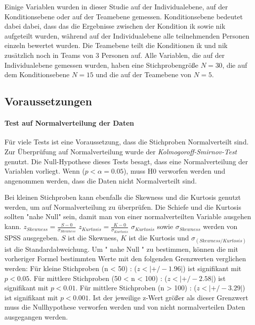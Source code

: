 \documentclass[a4paper,11pt]{article}%
\renewcommand{\\}{\vspace*{0.5\baselineskip} \newline}
\begin{document}
Einige Variablen wurden in dieser Studie auf der Individualebene, auf der Konditionsebene oder auf der Teamebene gemessen.
Konditionsebene bedeutet dabei dabei, dass das die Ergebnisse zwischen der Kondition \ac{ik} sowie \ac{nik} aufgeteilt wurden, während auf der Individualebene alle teilnehmenden Personen einzeln bewertet wurden. Die Teamebene teilt die Konditionen \ac{ik} und \ac{nik} zusätzlich noch in Teams von 3 Personen auf.  Alle Variablen, die auf der Individualebene gemessen wurden, haben eine Stichprobengröße $N = 30$, die auf dem Konditionsebene $ N = 15$ und die auf der Teamebene von $N = 5$.

	\subsection{Voraussetzungen}
	
\paragraph{Test auf Normalverteilung der Daten}
Für viele Tests ist eine Voraussetzung, dass die Stichproben Normalverteilt sind. Zur Überprüfung auf Normalverteilung wurde der \textit{Kolmogoroff-Smirnov-Test} genutzt. Die Null-Hypothese dieses Tests besagt, dass eine Normalverteilung der Variablen vorliegt. Wenn ($p < \alpha = 0.05$), muss H0 verworfen werden und angenommen werden, dass die Daten nicht Normalverteilt sind.

Bei kleinen Stichproben kann ebenfalls die Skewness und die Kurtosis genutzt werden, um auf Normalverteilung zu überprüfen. 
Die Schiefe und die Kurtosis sollten "nahe Null" sein, damit man von einer normalverteilten Variable ausgehen kann. \\$ z_{Skewness} = \frac{S-0}{\sigma_{Skewness}} $ \\ $ z_{Kurtosis} = \frac{K-0}{\sigma_{Kurtosis}} $ \\
$\sigma_{Kurtosis}$ sowie $\sigma_{Skewness}$ werden von SPSS ausgegeben. $S$ ist die Skewness, $K$ ist die Kurtosis und ${\sigma_{(Skewness/Kurtosis)}}$ ist die Standardabweichung.
Um " nahe Null " zu bestimmen, können die mit vorheriger Formel bestimmten Werte mit den folgenden Grenzwerten verglichen werden:
Für kleine Stichproben (n < 50) : ($z < |+/-1.96|$) ist signifikant mit $p<0.05$. \newline
Für mittlere Stichproben (50 < n < 100) : ($z < |+/-2.58|$) ist signifikant mit $p<0.01$. \newline
Für mittlere Stichproben (n > 100) : ($z < |+/-3.29|$) ist signifikant mit $p<0.001$. \newline
Ist der jeweilige z-Wert größer als dieser Grenzwert muss die Nullhypothese verworfen werden und von nicht normalverteilen Daten ausgegangen werden.
\citep[p.184]{field2013discovering}
\end{document}
